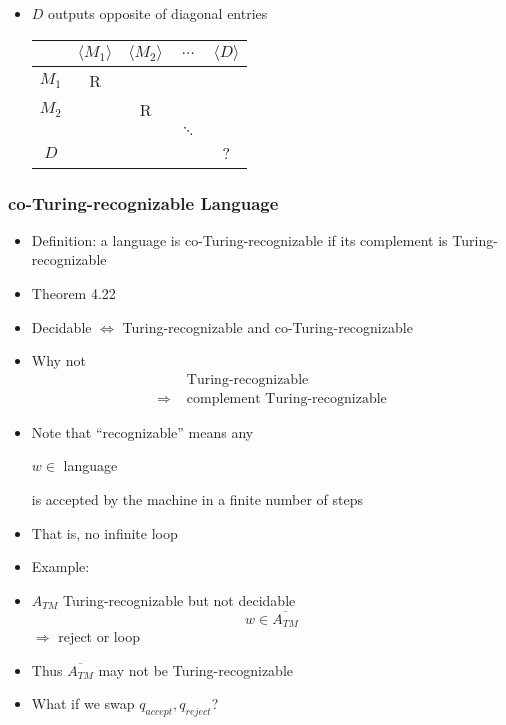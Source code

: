 \begin{frame}[allowframebreaks]
\begin{itemize}
\item $D$ outputs \alert{opposite of diagonal entries}
  \begin{center}
    \begin{tabular}{c|cccc}
& $\langle  M_1\rangle $ & $\langle  M_2\rangle $ & $\ldots$ & $\langle  D\rangle $\\ \hline
$M_1$ & R & &&\\
$M_2$ &  & R && \\
&& & $\ddots$ & \\
$D$ &&&& ?
    \end{tabular}
  \end{center}

\end{itemize}\end{frame} \begin{frame}[allowframebreaks] \frametitle{co-Turing-recognizable Language}
  \begin{itemize}
\item Definition: a language is co-Turing-recognizable
if its complement is Turing-recognizable
\item Theorem 4.22
\item[] Decidable $\Leftrightarrow$
Turing-recognizable and co-Turing-recognizable
\item Why not
  \begin{equation*}
    \begin{split}
&   \text{ Turing-recognizable} \\
\Rightarrow & \text{ complement Turing-recognizable}
\end{split}
\end{equation*}
\item Note that ``recognizable'' means any
  \begin{center}
  $w \in $ language
\end{center}
is accepted by the machine in \alert{a finite number of steps}
\item That is, no infinite loop
\item Example:
\item [] $A_{TM}$ Turing-recognizable but not decidable
  \begin{equation*}
    w \in \overline{A_{TM}}
  \end{equation*}
  $\Rightarrow$ reject or loop

  
\item [] Thus $\overline{A_{TM}}$ may not be Turing-recognizable

\item What if we swap $q_{accept},q_{reject}$?


\end{itemize}
\end{frame}
